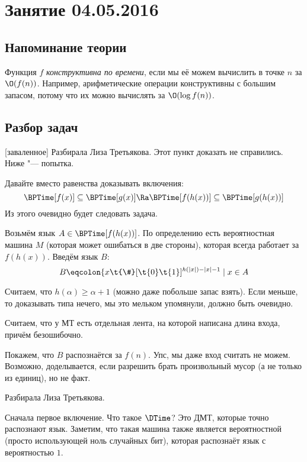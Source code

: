 \chapter{Занятие 04.05.2016}

\section{Напоминание теории}
	\begin{Def}
		Функция $f$ \textit{конструктивна по времени}, если мы её можем вычислить в точке $n$
		за $\O(f(n))$.
		Например, арифметические операции конструктивны с большим запасом, потому что
		их можно вычислять за $\O(\log f(n))$.
	\end{Def}

\section{Разбор задач}
[заваленное]
	Разбирала Лиза Третьякова.
	Этот пункт доказать не справились.
	Ниже "--- попытка.

	Давайте вместо равенства доказывать включения:
	\[ \BPTime[f(x)] \subseteq \BPTime[g(x)]  \Ra \BPTime[f(h(x))] \subseteq \BPTime[g(h(x))] \]
	Из этого очевидно будет следовать задача.

	Возьмём язык $A \in \BPTime[f(h(x))]$.
	По определению есть вероятностная машина $M$ (которая может ошибаться в две стороны), которая
	всегда работает за $f(h(x))$.
	Введём язык $B$:
	\[ B \eqcolon \{ x\t{\#}[\t{0}\t{1}]^{h(|x|)-|x|-1} \mid x \in A \]
	\begin{Rem}
		Считаем, что $h(\alpha) \ge \alpha + 1$ (можно даже побольше запас взять).
		Если меньше, то доказывать типа нечего, мы это мельком упомянули, должно быть очевидно.
	\end{Rem}
	\begin{Rem}
		Считаем, что у МТ есть отдельная лента, на которой написана длина входа, причём безошибочно.
	\end{Rem}
	Покажем, что $B$ распознаётся за $f(n)$.
	Упс, мы даже вход считать не можем.
	Возможно, доделывается, если разрешить брать произвольный мусор (а не только из единиц), но не факт.

	Разбирала Лиза Третьякова.

	Сначала первое включение.
	Что такое $\DTime$?
	Это ДМТ, которые точно распознают язык.
	Заметим, что такая машина также является вероятностной (просто использующей ноль случайных бит), которая распознаёт язык с вероятностью $1$.

